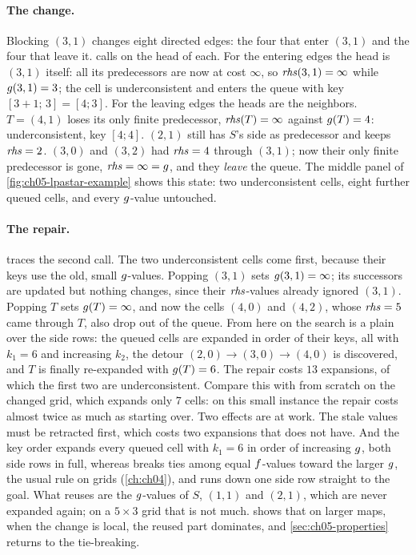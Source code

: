 \paragraph{The change.}
Blocking $(3,1)$ changes eight directed edges: the four that enter $(3,1)$ and the four
that leave it. \LpaMain calls \LpaUpdateVertex on the head of each. For the entering
edges the head is $(3,1)$ itself: all its predecessors are now at cost $\infty$, so
$\mathit{rhs}(3,1)=\infty$ while $g(3,1)=3$; the cell is underconsistent and enters the
queue with key $[3+1;\,3]=[4;3]$. For the leaving edges the heads are the neighbors.
$T=(4,1)$ loses its only finite predecessor, $\mathit{rhs}(T)=\infty$ against $g(T)=4$:
underconsistent, key $[4;4]$. $(2,1)$ still has $S$'s side as predecessor and keeps
$\mathit{rhs}=2$. $(3,0)$ and $(3,2)$ had $\mathit{rhs}=4$ through $(3,1)$; now their only finite
predecessor is gone, $\mathit{rhs}=\infty=g$, and they \emph{leave} the queue. The middle
panel of \cref{fig:ch05-lpastar-example} shows this state: two underconsistent cells,
eight further queued cells, and every $g$-value untouched.

\paragraph{The repair.}
 traces the second call. The two underconsistent cells
come first, because their keys use the old, small $g$-values. Popping $(3,1)$ sets
$g(3,1)=\infty$; its successors are updated but nothing changes, since their
$\mathit{rhs}$-values already ignored $(3,1)$. Popping $T$ sets $g(T)=\infty$, and now the
cells $(4,0)$ and $(4,2)$, whose $\mathit{rhs}=5$ came through $T$, also drop out of the queue.
From here on the search is a plain \astar over the side rows: the queued cells are
expanded in order of their keys, all with $k_1=6$ and increasing $k_2$, the detour
$(2,0)\to(3,0)\to(4,0)$ is discovered, and $T$ is finally re-expanded with
$g(T)=6$. The repair costs $13$ expansions, of which the first two are
underconsistent. Compare this with \astar from scratch on the changed grid, which
expands only $7$ cells: on this small instance the repair costs almost twice as much as
starting over. Two effects are at work. The stale values must be retracted first, which
costs two expansions that \astar does not have. And the key order expands every queued
cell with $k_1 = 6$ in order of increasing $g$, both side rows in full, whereas
\astar breaks ties among equal $f$-values toward the larger $g$, the usual
rule on grids (\cref{ch:ch04}), and runs down one side row straight to the goal. What
\lpastar reuses are the $g$-values of $S$, $(1,1)$ and $(2,1)$, which are never
expanded again; on a $5\times 3$ grid that is not much. 
shows that on larger maps, when the change is local, the reused part dominates, and
\cref{sec:ch05-properties} returns to the tie-breaking.

